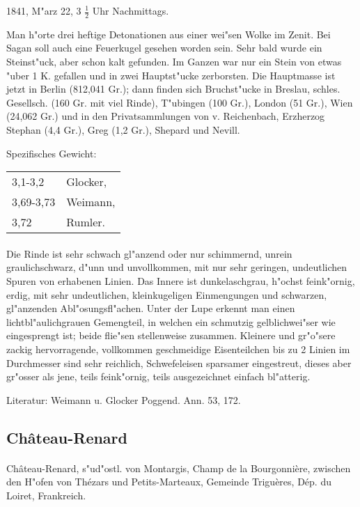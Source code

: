 \documentclass[a4paper, 11pt, oneside]{article}
\begin{document}
1841, M"arz 22, 3 $\frac{1}{2}$ Uhr Nachmittags.

Man h"orte drei heftige Detonationen aus einer wei"sen Wolke im Zenit. Bei Sagan soll auch eine Feuerkugel gesehen worden sein. Sehr bald wurde ein Steinst"uck, aber schon kalt gefunden. Im Ganzen war nur ein Stein von etwas "uber 1 K. gefallen und in zwei Hauptst"ucke zerborsten. Die Hauptmasse ist jetzt in Berlin (812,041 Gr.); dann finden sich Bruchst"ucke in Breslau, schles. Gesellsch. (160 Gr. mit viel Rinde), T"ubingen (100 Gr.), London (51 Gr.), Wien (24,062 Gr.) und in den Privatsammlungen von v. Reichenbach, Erzherzog Stephan (4,4 Gr.), Greg (1,2 Gr.), Shepard und Nevill.

Spezifisches Gewicht:
\begin{table}[!ht]
    \centering
    \begin{tabular}{l l}
        3,1-3,2 & Glocker,\\
        3,69-3,73 & Weimann,\\
        3,72 & Rumler.
    \end{tabular}
\end{table}
\paragraph{}
Die Rinde ist sehr schwach gl"anzend oder nur schimmernd, unrein graulichschwarz, d"unn und unvollkommen, mit nur sehr geringen, undeutlichen Spuren von erhabenen Linien. Das Innere ist dunkelaschgrau, h"ochst feink"ornig, erdig, mit sehr undeutlichen, kleinkugeligen Einmengungen und schwarzen, gl"anzenden Abl"osungsfl"achen. Unter der Lupe erkennt man einen lichtbl"aulichgrauen Gemengteil, in welchen ein schmutzig gelblichwei"ser wie eingesprengt ist; beide flie"sen stellenweise zusammen. Kleinere und gr"o"sere zackig hervorragende, vollkommen geschmeidige Eisenteilchen bis zu 2 Linien im Durchmesser sind sehr reichlich, Schwefeleisen sparsamer eingestreut, dieses aber gr"osser als jene, teils feink"ornig, teils ausgezeichnet einfach bl"atterig.

\footnotesize
Literatur: Weimann u. Glocker Poggend. Ann. 53, 172.

\subsection{Château-Renard}
\normalsize
\paragraph{}
Château-Renard, s"ud"ostl. von Montargis, Champ de la Bourgonnière, zwischen den H"ofen von Thézars und Petits-Marteaux, Gemeinde Triguères, Dép. du Loiret, Frankreich.
\end{document}

